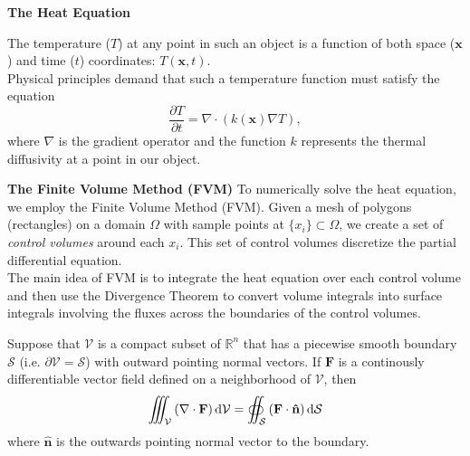 \documentclass[final]{beamer}
\begin{document}
\begin{frame}{\textbf{The Heat Equation}}

The temperature ($T$) at any point in such an object is a function of both space ($\mathbf{x}$) and time ($t$) coordinates: $T(\mathbf{x},t)$.\\\vspace{1em}\pause
Physical principles demand that such a temperature function must satisfy the equation
\begin{equation}
	\frac{\partial T}{\partial t}=\nabla\cdot\left(k(\mathbf{x})\nabla T\right)\label{eqn:HeatEq},
\end{equation}
where $\nabla$ is the gradient operator and the function $k$ represents the thermal diffusivity at a point in our object.
\end{frame}

\begin{frame}[t]{\bf The Finite Volume Method (FVM)}
	To numerically solve the heat equation, we employ the Finite Volume Method (FVM).\pause
	\vfill
	Given a mesh of polygons (rectangles) on a domain $\Omega$ with sample points at $\lbrace x_i\rbrace\subset\Omega$, we create a set of \textit{control volumes} around each $x_i$. This set of control volumes discretize the partial differential equation.\\\vfill\pause
	The main idea of FVM is to integrate the heat equation over each control volume and then use the Divergence Theorem to convert volume integrals into surface integrals involving the fluxes across the boundaries of the control volumes.
	\vfill
\end{frame}

\begin{frame}[plain]
	\begin{theorem}
		Suppose that $\mathcal{V}$ is a compact subset of $\mathbb{R}^n$ that has a piecewise smooth boundary $\mathcal{S}$ (i.e. $\partial\mathcal{V}=\mathcal{S}$) with outward pointing normal vectors. If $\mathbf{F}$ is a continously differentiable vector field defined on a neighborhood of $\mathcal{V}$, then
		\begin{equation}
			\iiint_{\mathcal{V}}\left(\nabla\cdot\mathbf{F}\right)\dif\mathcal{V}=\oiint_{\mathcal{S}}\left(\mathbf{F}\cdot\mathbf{\hat{n}}\right)\dif\mathcal{S}\label{eqn:div-thm}
		\end{equation}
		where $\hat{\mathbf{n}}$ is the outwards pointing normal vector to the boundary.
		\label{thm:div-thm}
	\end{theorem}
\end{frame}
\end{document}

